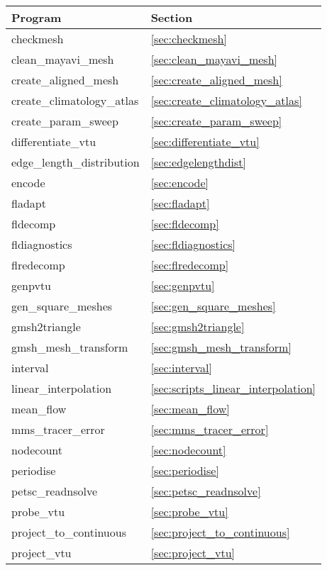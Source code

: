\begin{table}
\begin{center}
  \begin{tabular}{| l | l |}
    \hline
	Program					& Section 				\\
    \hline
	checkmesh				& \ref{sec:checkmesh}			\\
    clean\_mayavi\_mesh       & \ref{sec:clean_mayavi_mesh} \\
	create\_aligned\_mesh 			& \ref{sec:create_aligned_mesh}	\\
	create\_climatology\_atlas		& \ref{sec:create_climatology_atlas}	\\
	create\_param\_sweep			& \ref{sec:create_param_sweep}		\\
	differentiate\_vtu          		& \ref{sec:differentiate_vtu}		\\
	edge\_length\_distribution		& \ref{sec:edgelengthdist} 		\\
	encode                  		& \ref{sec:encode} 	        	\\
	fladapt					& \ref{sec:fladapt}			\\
	fldecomp				& \ref{sec:fldecomp}			\\
	fldiagnostics				& \ref{sec:fldiagnostics}		\\
	flredecomp				& \ref{sec:flredecomp}			\\
	genpvtu					& \ref{sec:genpvtu}			\\
	gen\_square\_meshes			& \ref{sec:gen_square_meshes} 		\\
	gmsh2triangle				& \ref{sec:gmsh2triangle}		\\
	gmsh\_mesh\_transform			& \ref{sec:gmsh_mesh_transform}	\\
	interval				& \ref{sec:interval} 			\\
	linear\_interpolation			& \ref{sec:scripts_linear_interpolation} \\	
	mean\_flow				& \ref{sec:mean_flow}			\\
	mms\_tracer\_error			& \ref{sec:mms_tracer_error}		\\
	nodecount				& \ref{sec:nodecount}			\\
	periodise				& \ref{sec:periodise}			\\
	petsc\_readnsolve			& \ref{sec:petsc_readnsolve} 		\\
	probe\_vtu  				& \ref{sec:probe_vtu} 			\\
	project\_to\_continuous			& \ref{sec:project_to_continuous} 	\\
	project\_vtu				& \ref{sec:project_vtu} 		\\

\end{tabular}
\end{center}
\end{table}
